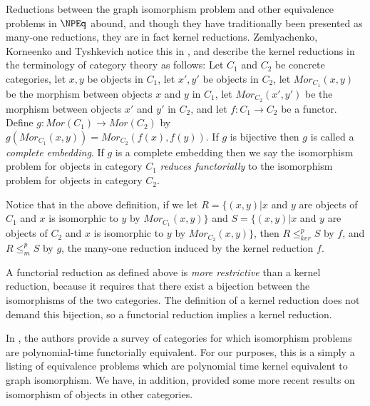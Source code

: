 \documentclass{article}
\theoremstyle{definition} \newtheorem{definition}[definition]{Definition}
\newcommand{\kr}{\leq^{p}_{ker}} %
\newcommand{\mor}{\leq^{p}_{m}} %
\newcommand{\defn}[1]{\emph{#1}} %
\begin{document}
Reductions between the graph isomorphism problem and other equivalence problems
in $\NPEq$ abound, and though they have traditionally been presented as
many-one reductions, they are in fact kernel reductions. Zemlyachenko,
Korneenko and Tyshkevich notice this in \cite{zkt85}, and describe the kernel
reductions in the terminology of category theory as follows: Let $C_1$ and
$C_2$ be concrete categories, let $x,y$ be objects in $C_1$, let $x', y'$ be
objects in $C_2$, let $Mor_{C_1}(x,y)$ be the morphism between objects $x$ and
$y$ in $C_1$, let $Mor_{C_2}(x',y')$ be the morphism between objects $x'$ and
$y'$ in $C_2$, and let $f\colon C_1\to C_2$ be a functor. Define $g\colon
Mor(C_1)\to Mor(C_2)$ by $g(Mor_{C_1}(x,y))=Mor_{C_2}(f(x), f(y))$. If $g$ is
bijective then $g$ is called a \defn{complete embedding}. If $g$ is a complete
embedding then we say the isomorphism problem for objects in category $C_1$
\defn{reduces functorially} to the isomorphism problem for objects in category
$C_2$.

Notice that in the above definition, if we let $R=\{(x,y)| x$ and $y$ are
objects of $C_1$ and $x$ is isomorphic to $y$ by $Mor_{C_1}(x,y)\}$ and
$S=\{(x,y)| x$ and $y$ are objects of $C_2$ and $x$ is isomorphic to $y$ by
$Mor_{C_2}(x,y)\}$, then $R\kr S$ by $f$, and $R\mor S$ by $g$, the many-one
reduction induced by the kernel reduction $f$.

A functorial reduction as defined above is \emph{more restrictive} than a
kernel reduction, because it requires that there exist a bijection between the
isomorphisms of the two categories. The definition of a kernel reduction does
not demand this bijection, so a functorial reduction implies a kernel
reduction.

In \cite{zkt85}, the authors provide a survey of categories for which
isomorphism problems are polynomial-time functorially equivalent. For our
purposes, this is a simply a listing of equivalence problems which are
polynomial time kernel equivalent to graph isomorphism. We have, in addition,
provided some more recent results on isomorphism of objects in other
categories.
\end{document}
